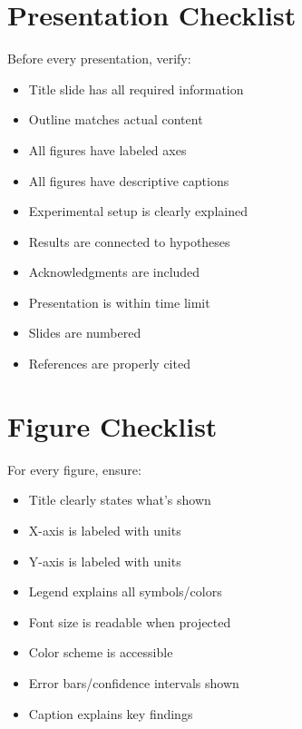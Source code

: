 \documentclass[11pt,a4paper]{article}
\begin{document}
\appendix

\newpage

\section{Presentation Checklist}

Before every presentation, verify:

\begin{itemize}
    \item[$\Box$] Title slide has all required information
    \item[$\Box$] Outline matches actual content
    \item[$\Box$] All figures have labeled axes
    \item[$\Box$] All figures have descriptive captions
    \item[$\Box$] Experimental setup is clearly explained
    \item[$\Box$] Results are connected to hypotheses
    \item[$\Box$] Acknowledgments are included
    \item[$\Box$] Presentation is within time limit
    \item[$\Box$] Slides are numbered
    \item[$\Box$] References are properly cited
\end{itemize}

\section{Figure Checklist}

For every figure, ensure:

\begin{itemize}
    \item[$\Box$] Title clearly states what's shown
    \item[$\Box$] X-axis is labeled with units
    \item[$\Box$] Y-axis is labeled with units
    \item[$\Box$] Legend explains all symbols/colors
    \item[$\Box$] Font size is readable when projected
    \item[$\Box$] Color scheme is accessible
    \item[$\Box$] Error bars/confidence intervals shown
    \item[$\Box$] Caption explains key findings
\end{itemize}
\end{document}
